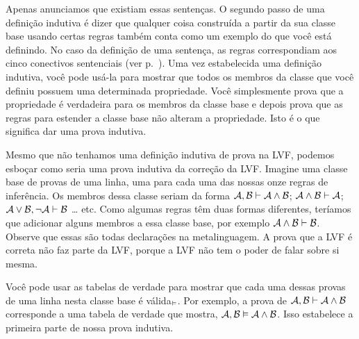 Apenas anunciamos que existiam essas senten\c cas. O segundo passo de uma defini\c c\~ao indutiva \'e dizer que qualquer coisa constru\'ida a partir da sua classe base usando certas regras tamb\'em conta como um exemplo do que voc\^e est\'a definindo. No caso da defini\c c\~ao de uma senten\c ca, as regras correspondiam aos cinco conectivos sentenciais (ver  p.~\pageref{TFLsentences}). Uma vez  estabelecida uma defini\c c\~ao indutiva, voc\^e pode us\'a-la para mostrar que todos os membros da classe que voc\^e definiu possuem uma determinada propriedade. Voc\^e simplesmente prova que a propriedade \'e verdadeira para os membros da classe base e depois prova que as regras para estender a classe base n\~ao alteram a propriedade. Isto \'e o que significa dar uma prova indutiva.
 
 Mesmo que n\~ao tenhamos uma defini\c c\~ao indutiva de prova na LVF, podemos esbo\c car como seria uma prova indutiva da corre\c c\~ao da LVF. Imagine uma classe base de provas de uma linha, uma para cada uma das nossas onze regras de infer\^encia. Os membros dessa classe seriam da forma $\mathcal{A}, \mathcal{B} \vdash  \mathcal{A} \wedge \mathcal{B}$; $\mathcal{A} \wedge \mathcal{B} \vdash \mathcal{A}$; $\mathcal{A} \vee \mathcal{B}, \neg\mathcal{A} \vdash  \mathcal{B}$ \ldots{} etc. Como algumas regras t\^em duas formas diferentes, ter\'iamos que adicionar alguns membros a essa classe base, por exemplo $\mathcal{A} \wedge \mathcal{B} \vdash  \mathcal{B}$.  Observe que essas s\~ao todas declara\c c\~oes na metalinguagem. A prova  que a LVF \'e correta n\~ao faz parte da LVF, porque a LVF n\~ao tem o poder de falar sobre si mesma.

Voc\^e pode usar as tabelas de verdade para mostrar que cada uma dessas provas de uma linha  nesta classe base \'e v\'alida$_{\vDash}$. Por exemplo, a prova de $\mathcal{A}, \mathcal{B} \vdash \mathcal{A} \wedge \mathcal{B}$ corresponde a uma tabela de verdade que mostra, $\mathcal{A}, \mathcal{B} \vDash  \mathcal{A} \wedge \mathcal{B}$. Isso estabelece a primeira parte de nossa prova indutiva.  

